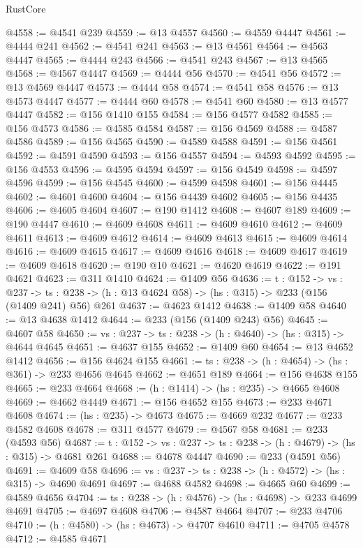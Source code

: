 \begin{lexlean}{RustCore}
\begin{coremodule}
@4558 := @4541 @239
@4559 := @13 @4557
@4560 := @4559 @4447
@4561 := @4444 @241
@4562 := @4541 @241
@4563 := @13 @4561
@4564 := @4563 @4447
@4565 := @4444 @243
@4566 := @4541 @243
@4567 := @13 @4565
@4568 := @4567 @4447
@4569 := @4444 @56
@4570 := @4541 @56
@4572 := @13 @4569 @4447
@4573 := @4444 @58
@4574 := @4541 @58
@4576 := @13 @4573 @4447
@4577 := @4444 @60
@4578 := @4541 @60
@4580 := @13 @4577 @4447
@4582 := @156 @1410 @155
@4584 := @156 @4577 @4582
@4585 := @156 @4573
@4586 := @4585 @4584
@4587 := @156 @4569
@4588 := @4587 @4586
@4589 := @156 @4565
@4590 := @4589 @4588
@4591 := @156 @4561
@4592 := @4591 @4590
@4593 := @156 @4557
@4594 := @4593 @4592
@4595 := @156 @4553
@4596 := @4595 @4594
@4597 := @156 @4549
@4598 := @4597 @4596
@4599 := @156 @4545
@4600 := @4599 @4598
@4601 := @156 @4445
@4602 := @4601 @4600
@4604 := @156 @4439 @4602
@4605 := @156 @4435
@4606 := @4605 @4604
@4607 := @190 @1412
@4608 := @4607 @189
@4609 := @190 @4447
@4610 := @4609 @4608
@4611 := @4609 @4610
@4612 := @4609 @4611
@4613 := @4609 @4612
@4614 := @4609 @4613
@4615 := @4609 @4614
@4616 := @4609 @4615
@4617 := @4609 @4616
@4618 := @4609 @4617
@4619 := @4609 @4618
@4620 := @190 @10
@4621 := @4620 @4619
@4622 := @191 @4621
@4623 := @311 @1410
@4624 := @1409 @56
@4636 := {t : @152} ->
  {vs : @237} ->
  {ts : @238} -> (h : @13 @4624 @58) -> (hs : @315) -> @233 (@156 (@1409 @241) @56) @261
@4637 := @4623 @1412
@4638 := @1409 @58
@4640 := @13 @4638 @1412
@4644 := @233 (@156 (@1409 @243) @56)
@4645 := @4607 @58
@4650 := {vs : @237} -> {ts : @238} -> (h : @4640) -> (hs : @315) -> @4644 @4645
@4651 := @4637 @155
@4652 := @1409 @60
@4654 := @13 @4652 @1412
@4656 := @156 @4624 @155
@4661 := {ts : @238} -> (h : @4654) -> (hs : @361) -> @233 @4656 @4645
@4662 := @4651 @189
@4664 := @156 @4638 @155
@4665 := @233 @4664
@4668 := (h : @1414) -> (hs : @235) -> @4665 @4608
@4669 := @4662 @4449
@4671 := @156 @4652 @155
@4673 := @233 @4671 @4608
@4674 := (hs : @235) -> @4673
@4675 := @4669 @232
@4677 := @233 @4582 @4608
@4678 := @311 @4577
@4679 := @4567 @58
@4681 := @233 (@4593 @56)
@4687 := {t : @152} -> {vs : @237} -> {ts : @238} -> (h : @4679) -> (hs : @315) -> @4681 @261
@4688 := @4678 @4447
@4690 := @233 (@4591 @56)
@4691 := @4609 @58
@4696 := {vs : @237} -> {ts : @238} -> (h : @4572) -> (hs : @315) -> @4690 @4691
@4697 := @4688 @4582
@4698 := @4665 @60
@4699 := @4589 @4656
@4704 := {ts : @238} -> (h : @4576) -> (hs : @4698) -> @233 @4699 @4691
@4705 := @4697 @4608
@4706 := @4587 @4664
@4707 := @233 @4706
@4710 := (h : @4580) -> (hs : @4673) -> @4707 @4610
@4711 := @4705 @4578
@4712 := @4585 @4671

\end{coremodule}
\end{lexlean}
